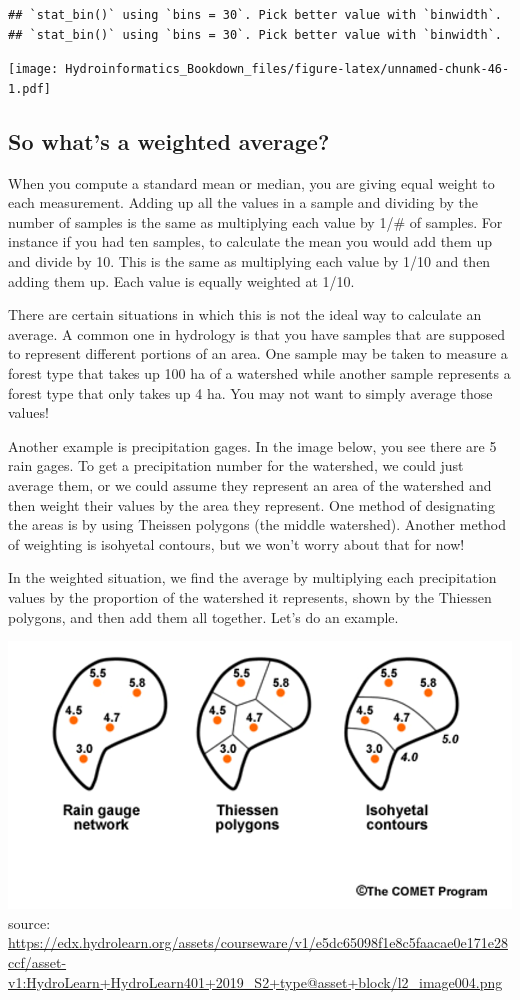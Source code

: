 \documentclass[
]{book}
\begin{document}
\begin{verbatim}
## `stat_bin()` using `bins = 30`. Pick better value with `binwidth`.
## `stat_bin()` using `bins = 30`. Pick better value with `binwidth`.
\end{verbatim}

\texttt{[image: Hydroinformatics\_Bookdown\_files/figure-latex/unnamed-chunk-46-1.pdf]}

\hypertarget{so-whats-a-weighted-average}{%
\subsection{So what's a weighted average?}\label{so-whats-a-weighted-average}}

When you compute a standard mean or median, you are giving equal weight to each measurement. Adding up all the values in a sample and dividing by the number of samples is the same as multiplying each value by 1/\# of samples. For instance if you had ten samples, to calculate the mean you would add them up and divide by 10. This is the same as multiplying each value by 1/10 and then adding them up. Each value is equally weighted at 1/10.

There are certain situations in which this is not the ideal way to calculate an average. A common one in hydrology is that you have samples that are supposed to represent different portions of an area. One sample may be taken to measure a forest type that takes up 100 ha of a watershed while another sample represents a forest type that only takes up 4 ha. You may not want to simply average those values!

Another example is precipitation gages. In the image below, you see there are 5 rain gages. To get a precipitation number for the watershed, we could just average them, or we could assume they represent an area of the watershed and then weight their values by the area they represent. One method of designating the areas is by using Theissen polygons (the middle watershed). Another method of weighting is isohyetal contours, but we won't worry about that for now!

In the weighted situation, we find the average by multiplying each precipitation values by the proportion of the watershed it represents, shown by the Thiessen polygons, and then add them all together. Let's do an example.

\includegraphics{images/theissen.png}source: \url{https://edx.hydrolearn.org/assets/courseware/v1/e5dc65098f1e8c5faacae0e171e28ccf/asset-v1:HydroLearn+HydroLearn401+2019_S2+type@asset+block/l2_image004.png}
\end{document}
